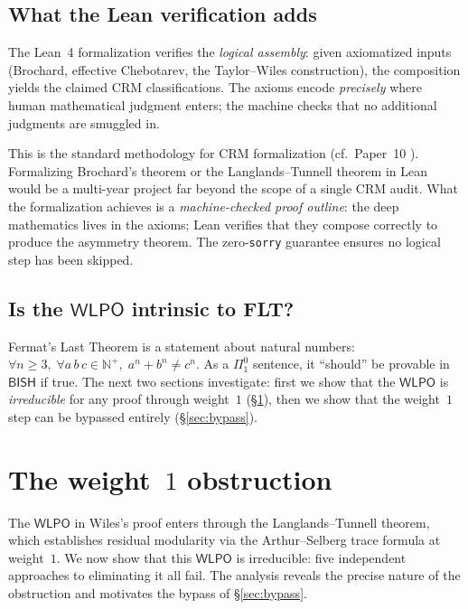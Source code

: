 \documentclass[11pt]{article}
\theoremstyle{plain}
\theoremstyle{definition}
\theoremstyle{remark}
\newcommand{\N}{\mathbb{N}}
\newcommand{\BISH}{\mathsf{BISH}}
\newcommand{\WLPO}{\mathsf{WLPO}}
\begin{document}
\subsection{What the Lean verification adds}

The Lean~4 formalization verifies the \emph{logical assembly}: given
axiomatized inputs (Brochard, effective Chebotarev, the Taylor--Wiles
construction), the composition yields the claimed CRM classifications.
The axioms encode \emph{precisely} where human mathematical judgment
enters; the machine checks that no additional judgments are smuggled in.

This is the standard methodology for CRM formalization (cf.\
Paper~10 \cite{Paper10}).  Formalizing Brochard's theorem or the
Langlands--Tunnell theorem in Lean would be a multi-year project far
beyond the scope of a single CRM audit.  What the formalization
achieves is a \emph{machine-checked proof outline}: the deep mathematics
lives in the axioms; Lean verifies that they compose correctly to
produce the asymmetry theorem.  The zero-\texttt{sorry} guarantee
ensures no logical step has been skipped.

\subsection{Is the \texorpdfstring{$\WLPO$}{WLPO} intrinsic to FLT?}

Fermat's Last Theorem is a statement about natural numbers:
$\forall n \ge 3,\; \forall a\,b\,c \in \N^+,\;
a^n + b^n \neq c^n$.  As a $\Pi^0_1$ sentence, it ``should'' be
provable in~$\BISH$ if true.  The next two sections investigate:
first we show that the $\WLPO$ is \emph{irreducible} for any
proof through weight~$1$ (\S\ref{sec:weight1}), then we show
that the weight~$1$ step can be bypassed entirely
(\S\ref{sec:bypass}).


\section{The weight~$1$ obstruction}\label{sec:weight1}

The $\WLPO$ in Wiles's proof enters through the
Langlands--Tunnell theorem, which establishes residual
modularity via the Arthur--Selberg trace formula at weight~$1$.
We now show that this $\WLPO$ is irreducible: five
independent approaches to eliminating it all fail.  The
analysis reveals the precise nature of the obstruction and
motivates the bypass of \S\ref{sec:bypass}.
\end{document}

